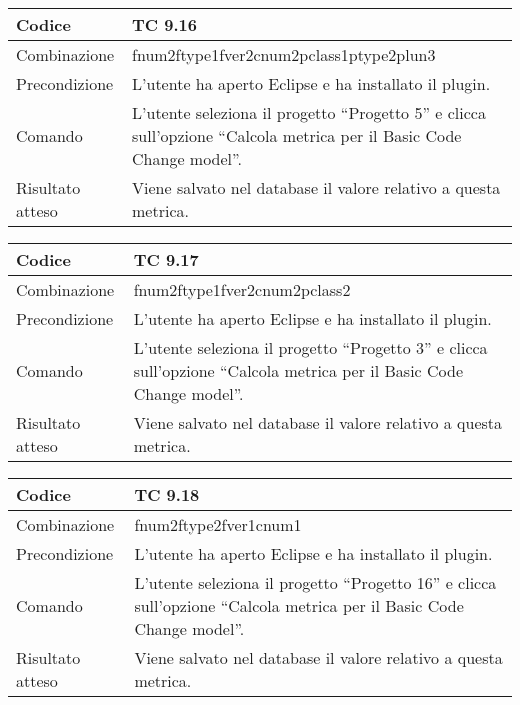 \begin{table}[ht]
\begin{tabular}{|p{3cm}|p{9cm}|}
\hline
\cellcolor{lightgray}Codice				& TC 9.16								\\
\hline
\cellcolor{lightgray}Combinazione		& fnum2ftype1fver2cnum2pclass1ptype2plun3									\\
\hline
\cellcolor{lightgray}Precondizione		& L'utente ha aperto Eclipse e ha installato il plugin.		\\
\hline
\cellcolor{lightgray}Comando			& L'utente seleziona il progetto ``Progetto 5''  e clicca sull'opzione ``Calcola metrica per il Basic Code Change model''.	\\
\hline
\cellcolor{lightgray}Risultato atteso	& Viene salvato nel database il valore relativo a questa metrica.\\
\hline
\end{tabular}
\end{table}


\begin{table}[ht]
\begin{tabular}{|p{3cm}|p{9cm}|}
\hline
\cellcolor{lightgray}Codice				& TC 9.17								\\
\hline
\cellcolor{lightgray}Combinazione		& fnum2ftype1fver2cnum2pclass2									\\
\hline
\cellcolor{lightgray}Precondizione		& L'utente ha aperto Eclipse e ha installato il plugin.		\\
\hline
\cellcolor{lightgray}Comando			& L'utente seleziona il progetto ``Progetto 3''  e clicca sull'opzione ``Calcola metrica per il Basic Code Change model''.	\\
\hline
\cellcolor{lightgray}Risultato atteso	& Viene salvato nel database il valore relativo a questa metrica.\\
\hline
\end{tabular}
\end{table}

\begin{table}[ht]
\begin{tabular}{|p{3cm}|p{9cm}|}
\hline
\cellcolor{lightgray}Codice				& TC 9.18								\\
\hline
\cellcolor{lightgray}Combinazione		& fnum2ftype2fver1cnum1									\\
\hline
\cellcolor{lightgray}Precondizione		& L'utente ha aperto Eclipse e ha installato il plugin.		\\
\hline
\cellcolor{lightgray}Comando			& L'utente seleziona il progetto ``Progetto 16''  e clicca sull'opzione ``Calcola metrica per il Basic Code Change model''.	\\
\hline
\cellcolor{lightgray}Risultato atteso	& Viene salvato nel database il valore relativo a questa metrica.\\
\hline
\end{tabular}
\end{table}

